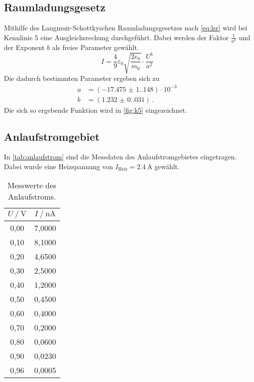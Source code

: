 \subsection{Raumladungsgesetz}

Mithilfe des Langmuir-Schottkyschen Raumladungsgesetzes nach \autoref{eq:lsr} wird bei Kennlinie 5 eine Ausgleichsrechung durchgeführt. 
Dabei werden der Faktor $\frac{1}{a^{2}}$ und der Exponent $b$ als freiee Parameter gewählt.
\begin{equation*}
  I= \frac{4}{9} \varepsilon_{0} \sqrt{\frac{2 e_{0}}{m_{0}}} \cdot \frac{U^{b}}{a^2}
\end{equation*}
Die dadurch bestimmten Parameter ergeben sich zu
\begin{align*}
  a &= (\num{-17.475(1.148)}) \cdot 10^{-3} \\
  b &= (\num{1.232(0.031)}) \, . 
\end{align*}
Die sich so ergebende Funktion wird in \autoref{fig:k5} eingezeichnet.


\subsection{Anlaufstromgebiet}

In \autoref{tab:anlaufstrom} sind die Messdaten des Anlaufstromgebietes eingetragen. Dabei wurde
eine Heizspannung von $I_{\text{Heiz}} = \qty{2.4}{\ampere}$ gewählt.
\begin{table}
  \centering
  \caption{Messwerte des Anlaufstroms.}
  \label{tab:anlaufstrom}
  \begin{tabular}{c c}
    \toprule
    $U \mathbin{/} \unit{\volt}$ &
    $I \mathbin{/} \unit{\nano\ampere}$ \\
    \midrule
    0,00 & 7,0000 \\
    0,10 & 8,1000 \\
    0,20 & 4,6500 \\
    0,30 & 2,5000 \\
    0,40 & 1,2000 \\
    0,50 & 0,4500 \\
    0,60 & 0,4000 \\
    0,70 & 0,2000 \\
    0,80 & 0,0600 \\
    0,90 & 0,0230 \\
    0,96 & 0,0005 \\
    \bottomrule
  \end{tabular}
\end{table}

